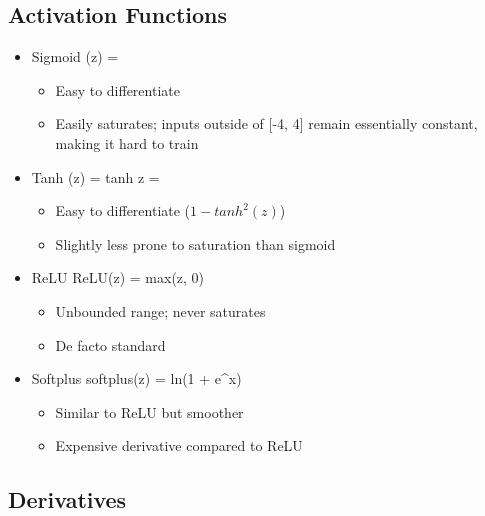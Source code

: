 \documentclass[12pt]{article}
\newenvironment{eqn}{\equation\alignedat{3}}{\endalignedat\endequation}
\begin{document}
\subsection{Activation Functions}

\begin{itemize}
	\item Sigmoid
	\begin{eqn}
		\phi(z) = 
	\end{eqn}
	\begin{itemize}
		\item Easy to differentiate 
		\item Easily saturates; inputs outside of [-4, 4] remain essentially constant, making it hard to train
	\end{itemize}
	\item Tanh 
	\begin{eqn}
		\phi(z) = tanh z = 
	\end{eqn}
	\begin{itemize}
		\item Easy to differentiate ($1 - tanh^2(z)$)
		\item Slightly less prone to saturation than sigmoid
	\end{itemize}
	\item ReLU 
	\begin{eqn}
		ReLU(z) = max(z, 0)
	\end{eqn}
	\begin{itemize}
		\item Unbounded range; never saturates 
	\item De facto standard
	\end{itemize}
	\item Softplus
	\begin{eqn}
		softplus(z) = ln(1 + e^x)
	\end{eqn}
	\begin{itemize}
		\item Similar to ReLU but smoother
		\item Expensive derivative compared to ReLU
	\end{itemize}
\end{itemize} 

\subsection{Derivatives}
\end{document}
